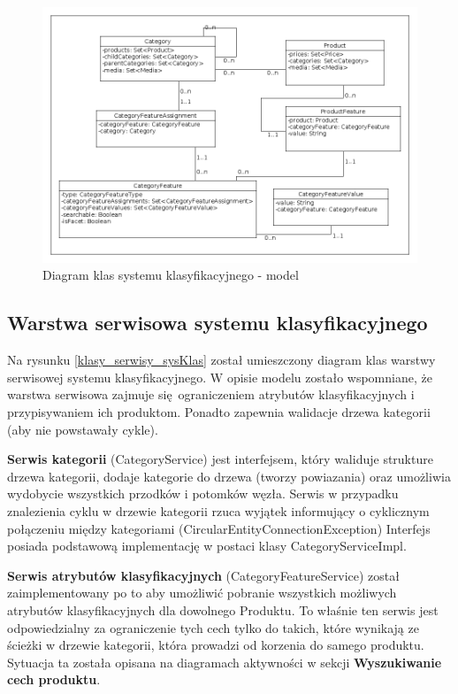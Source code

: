 \begin{figure}
	\begin{center}
		\includegraphics[scale=0.4]{klasy_model_sysKlas.png}
	\end{center}
	\caption{{\color{black}Diagram klas systemu klasyfikacyjnego - model}} \label{klasy_model_sysKlas}
\end{figure}

\subsection{Warstwa serwisowa systemu klasyfikacyjnego}
Na rysunku \ref{klasy_serwisy_sysKlas} został umieszczony diagram klas warstwy serwisowej systemu klasyfikacyjnego. W opisie modelu zostało wspomniane, że warstwa serwisowa zajmuje się ograniczeniem atrybutów klasyfikacyjnych i przypisywaniem ich produktom. Ponadto zapewnia walidacje drzewa kategorii (aby nie powstawały cykle).

\noindent
\textbf{Serwis kategorii} (CategoryService) jest interfejsem, który waliduje strukture drzewa kategorii, dodaje kategorie do drzewa (tworzy powiazania) oraz umożliwia wydobycie wszystkich przodków i potomków węzła. Serwis w przypadku znalezienia cyklu w drzewie kategorii rzuca wyjątek informujący o cyklicznym połączeniu między kategoriami (CircularEntityConnectionException) Interfejs posiada podstawową implementację w postaci klasy CategoryServiceImpl. 

\noindent
\textbf{Serwis atrybutów klasyfikacyjnych} (CategoryFeatureService) został zaimplementowany po to aby umożliwić pobranie wszystkich możliwych atrybutów klasyfikacyjnych dla dowolnego Produktu. To właśnie ten serwis jest odpowiedzialny za ograniczenie tych cech tylko do takich, które wynikają ze ścieżki w drzewie kategorii, która prowadzi od korzenia do samego produktu. Sytuacja ta została opisana na diagramach aktywności w sekcji \textbf{Wyszukiwanie cech produktu}.

